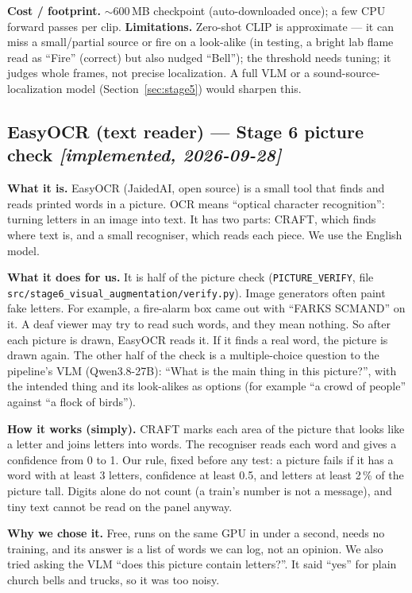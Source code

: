 \documentclass[11pt,a4paper]{article}
\begin{document}
\textbf{Cost / footprint.} $\sim$600\,MB checkpoint (auto-downloaded once); a few CPU forward passes
per clip. \textbf{Limitations.} Zero-shot CLIP is approximate --- it can miss a small/partial source
or fire on a look-alike (in testing, a bright lab flame read as ``Fire'' (correct) but also nudged
``Bell''); the threshold needs tuning; it judges whole frames, not precise localization. A full VLM
or a sound-source-localization model (Section~\ref{sec:stage5}) would sharpen this.

\subsection{EasyOCR (text reader) --- Stage 6 picture check \emph{[implemented, 2026-09-28]}}
\textbf{What it is.} EasyOCR (JaidedAI, open source) is a small tool that finds and reads printed
words in a picture. OCR means ``optical character recognition'': turning letters in an image into
text. It has two parts: CRAFT, which finds where text is, and a small recogniser, which reads each
piece. We use the English model.

\textbf{What it does for us.} It is half of the picture check (\texttt{PICTURE\_VERIFY}, file
\texttt{src/stage6\_visual\_augmentation/verify.py}). Image generators often paint fake letters. For
example, a fire-alarm box came out with ``FARKS SCMAND'' on it. A deaf viewer may try to read such
words, and they mean nothing. So after each picture is drawn, EasyOCR reads it. If it finds a real
word, the picture is drawn again. The other half of the check is a multiple-choice question to the
pipeline's VLM (Qwen3.8-27B): ``What is the main thing in this picture?'', with the intended thing
and its look-alikes as options (for example ``a crowd of people'' against ``a flock of birds'').

\textbf{How it works (simply).} CRAFT marks each area of the picture that looks like a letter and
joins letters into words. The recogniser reads each word and gives a confidence from 0 to 1. Our rule,
fixed before any test: a picture fails if it has a word with at least 3 letters, confidence at least
0.5, and letters at least 2\,\% of the picture tall. Digits alone do not count (a train's number is
not a message), and tiny text cannot be read on the panel anyway.

\textbf{Why we chose it.} Free, runs on the same GPU in under a second, needs no training, and its
answer is a list of words we can log, not an opinion. We also tried asking the VLM ``does this
picture contain letters?''. It said ``yes'' for plain church bells and trucks, so it was too noisy.
\end{document}
